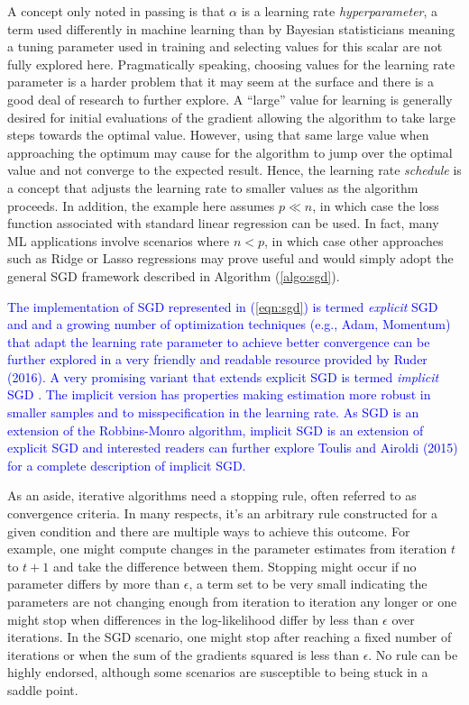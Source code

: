 \documentclass[12pt]{article}
\begin{document}
A concept only noted in passing is that $\alpha$ is a learning rate \textit{hyperparameter}, a term used differently in machine learning than by Bayesian statisticians meaning a tuning parameter used in training and selecting values for this scalar are not fully explored here. Pragmatically speaking, choosing values for the learning rate parameter is a harder problem that it may seem at the surface and there is a good deal of research to further explore. A ``large'' value for learning is generally desired for initial evaluations of the gradient allowing the algorithm to take large steps towards the optimal value. However, using that same large value when approaching the optimum may cause for the algorithm to jump over the optimal value and not converge to the expected result. Hence, the learning rate \textit{schedule} is a concept that adjusts the learning rate to smaller values as the algorithm proceeds. In addition, the example here assumes $p \ll n$, in which case the loss function associated with standard linear regression can be used. In fact, many ML applications involve scenarios where $n < p$, in which case other approaches such as Ridge or Lasso regressions may prove useful and would simply adopt the general SGD framework described in Algorithm (\ref{algo:sgd}). 

\textcolor{blue}{The implementation of SGD represented in (\ref{eqn:sgd}) is termed \textit{explicit} SGD and and a growing number of optimization techniques (e.g., Adam, Momentum) that adapt the learning rate parameter to achieve better convergence can be further explored in a very friendly and readable resource provided by Ruder (2016). A very promising variant that extends explicit SGD is termed \textit{implicit} SGD \cite{Toulis2015ScalableES}. The implicit version has properties making estimation more robust in smaller samples and to misspecification in the learning rate. As SGD is an extension of the Robbins-Monro algorithm, implicit SGD is an extension of explicit SGD and interested readers can further explore Toulis and Airoldi (2015) for a complete description of implicit SGD.}\nocite{Ruder2016}

As an aside, iterative algorithms need a stopping rule, often referred to as convergence criteria. In many respects, it's an arbitrary rule constructed for a given condition and there are multiple ways to achieve this outcome. For example, one might compute changes in the parameter estimates from iteration $t$ to $t+1$ and take the difference between them. Stopping might occur if no parameter differs by more than $\epsilon$, a term set to be very small indicating the parameters are not changing enough from iteration to iteration any longer or one might stop when differences in the log-likelihood differ by less than $\epsilon$ over iterations. In the SGD scenario, one might stop after reaching a fixed number of iterations or when the sum of the gradients squared is less than $\epsilon$. No rule can be highly endorsed, although some scenarios are susceptible to being stuck in a saddle point. 
\end{document}
